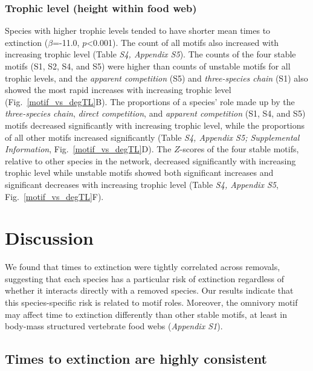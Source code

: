\documentclass[12pt]{article}
\begin{document}
\begin{spacing}{2.0}
        \subsubsection*{Trophic level (height within food web)}
            
            Species with higher trophic levels tended to have shorter mean times to extinction ($\beta$=-11.0, $p$\textless0.001).
            The count of all motifs also increased with increasing trophic level (Table \emph{S4, Appendix S5}). 
            The counts of the four stable motifs (S1, S2, S4, and S5) were higher than counts of unstable motifs for all trophic levels, and the \emph{apparent competition} (S5) and \emph{three-species chain} (S1) also showed the most rapid increases with increasing trophic level (Fig.~\ref{motif_vs_degTL}B).
            The proportions of a species' role made up by the \emph{three-species chain}, \emph{direct competition}, and \emph{apparent competition} (S1, S4, and S5) motifs decreased significantly with increasing trophic level, while the proportions of all other motifs increased significantly (Table \emph{S4, Appendix S5; Supplemental Information}, Fig.~\ref{motif_vs_degTL}D).
            The $Z$-scores of the four stable motifs, relative to other species in the network, decreased significantly with increasing trophic level while unstable motifs showed both significant increases and significant decreases with increasing trophic level (Table \emph{S4, Appendix S5}, Fig.~\ref{motif_vs_degTL}F).


\section*{Discussion}

    We found that times to extinction were tightly correlated across removals, suggesting that each species has a particular risk of extinction regardless of whether it interacts directly with a removed species. 
    Our results indicate that this species-specific risk is related to motif roles.
    Moreover, the omnivory motif may affect time to extinction differently than other stable motifs, at least in body-mass structured vertebrate food webs (\emph{Appendix S1}).


 	\subsection*{Times to extinction are highly consistent}


\end{spacing}
\end{document}
